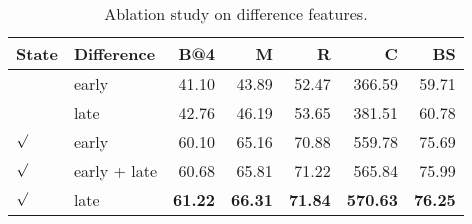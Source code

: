 \begin{table}[ht]
\centering
\small
\caption{Ablation study on difference features.}
\label{tab:diff}
\begin{tabular}{llrrrrr}
\toprule
State & Difference & B@4 & M & R & C & BS \\
\midrule
 & early & 41.10 & 43.89 & 52.47 & 366.59 & 59.71 \\
 & late & 42.76 & 46.19 & 53.65 & 381.51 & 60.78 \\
$\surd$ & early & 60.10 & 65.16 & 70.88 & 559.78 & 75.69 \\
$\surd$ & early + late & 60.68 & 65.81 & 71.22 & 565.84 & 75.99 \\
$\surd$ & late & \textbf{61.22} & \textbf{66.31} & \textbf{71.84} & \textbf{570.63} & \textbf{76.25} \\
\bottomrule
\end{tabular}
\end{table}

